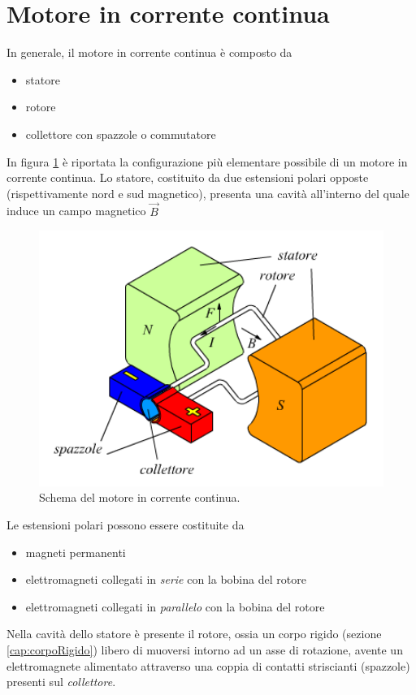 \documentclass[17pt]{extarticle}
\begin{document}
\clearpage

\section{Motore in corrente continua}


In generale, il motore in corrente continua è composto da
\begin{itemize}
	\item statore
	\item rotore
	\item collettore con spazzole o commutatore
\end{itemize}

In figura \ref{fig:motoreCorrenteContinua} è riportata la configurazione più elementare possibile di un motore in corrente continua. Lo statore, costituito da due estensioni polari opposte (rispettivamente nord e sud magnetico), presenta una cavità all'interno del quale induce un campo magnetico $\vec{B}$ 

 \begin{figure}[bh!]		
	\centering
   	\includegraphics[width=4.8in]{motoreCorrenteContinua.png}
  	\caption{Schema del motore in corrente continua.}
   	\label{fig:motoreCorrenteContinua}
\end{figure}


Le estensioni polari possono essere costituite da
\begin{itemize}
	\item magneti permanenti 
	\item elettromagneti collegati in \emph{serie} con la bobina del rotore
	\item elettromagneti collegati in \emph{parallelo} con la bobina del rotore
\end{itemize} 
Nella cavità dello statore è presente il rotore, ossia un corpo rigido (sezione \ref{cap:corpoRigido}) libero di muoversi intorno ad un asse di rotazione, avente un elettromagnete alimentato attraverso una coppia di contatti striscianti (spazzole) presenti sul \emph{collettore}.
\end{document}
